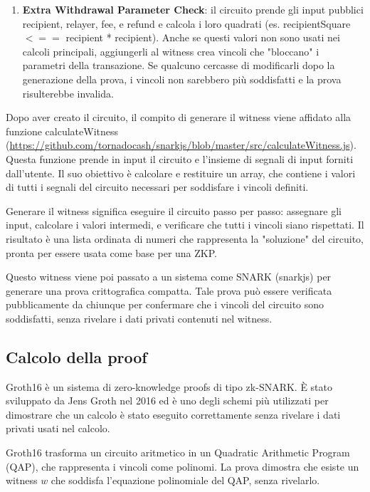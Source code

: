 \begin{enumerate}
\begin{itemize}
    \end{itemize}
    \item \textbf{Extra Withdrawal Parameter Check}: il circuito prende gli input pubblici recipient, relayer, fee, e refund e calcola i loro quadrati (es. recipientSquare $<==$ recipient * recipient).  Anche se questi valori non sono usati nei calcoli principali, aggiungerli al witness crea vincoli che "bloccano" i parametri della transazione. Se qualcuno cercasse di modificarli dopo la generazione della prova, i vincoli non sarebbero più soddisfatti e la prova risulterebbe invalida.
\end{enumerate}

Dopo aver creato il circuito, il compito di generare il witness viene affidato alla funzione calculateWitness (\url{https://github.com/tornadocash/snarkjs/blob/master/src/calculateWitness.js}). Questa funzione prende in input il circuito e l'insieme di segnali di input forniti dall’utente. Il suo obiettivo è calcolare e restituire un array, che contiene i valori di tutti i segnali del circuito necessari per soddisfare i vincoli definiti.

Generare il witness significa eseguire il circuito passo per passo: assegnare gli input, calcolare i valori intermedi, e verificare che tutti i vincoli siano rispettati. Il risultato è una lista ordinata di numeri che rappresenta la "soluzione" del circuito, pronta per essere usata come base per una ZKP.

Questo witness viene poi passato a un sistema come SNARK (snarkjs) per generare una prova crittografica compatta. Tale prova può essere verificata pubblicamente da chiunque per confermare che i vincoli del circuito sono soddisfatti, senza rivelare i dati privati contenuti nel witness.

\subsection{Calcolo della proof}

Groth16 è un sistema di zero-knowledge proofs di tipo zk-SNARK. È stato sviluppato da Jens Groth nel 2016 ed è uno degli schemi più utilizzati per dimostrare che un calcolo è stato eseguito correttamente senza rivelare i dati privati usati nel calcolo.

Groth16 trasforma un circuito aritmetico in un Quadratic Arithmetic Program (QAP), che rappresenta i vincoli come polinomi. La prova dimostra che esiste un witness 
$w$ che soddisfa l'equazione polinomiale del QAP, senza rivelarlo. 

